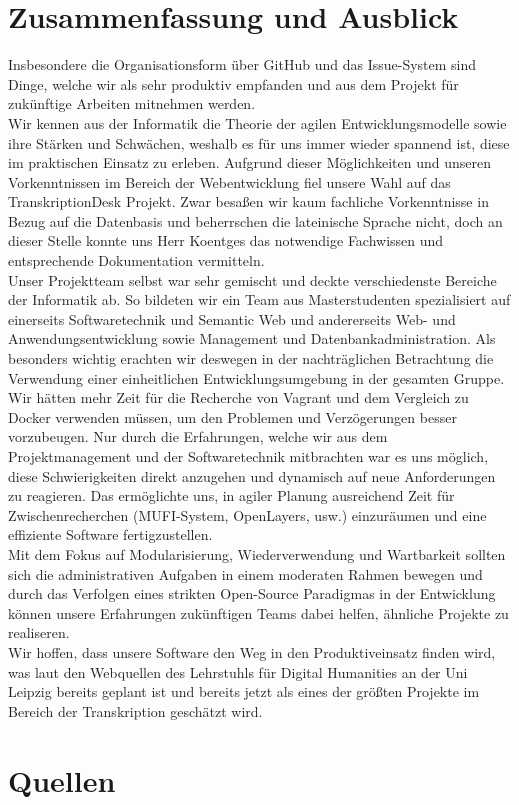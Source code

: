 \documentclass{article}
\begin{document}
\section{Zusammenfassung und Ausblick}
Insbesondere die Organisationsform über GitHub und das Issue-System sind Dinge, welche wir als sehr produktiv empfanden und aus dem Projekt für zukünftige Arbeiten mitnehmen werden.\\
Wir kennen aus der Informatik die Theorie der agilen Entwicklungsmodelle sowie ihre Stärken und Schwächen, weshalb es für uns immer wieder spannend ist, diese im praktischen Einsatz zu erleben.
Aufgrund dieser Möglichkeiten und unseren Vorkenntnissen im Bereich der Webentwicklung fiel unsere Wahl auf das TranskriptionDesk Projekt.
Zwar besaßen wir kaum fachliche Vorkenntnisse in Bezug auf die Datenbasis und beherrschen die lateinische Sprache nicht, doch an dieser Stelle konnte uns Herr Koentges das notwendige Fachwissen und entsprechende Dokumentation vermitteln.\\
Unser Projektteam selbst war sehr gemischt und deckte verschiedenste Bereiche der Informatik ab. So bildeten wir ein Team aus Masterstudenten 
spezialisiert auf einerseits Softwaretechnik und Semantic Web und andererseits Web- und Anwendungsentwicklung sowie Management und Datenbankadministration.
Als besonders wichtig erachten wir deswegen in der nachträglichen Betrachtung die Verwendung einer einheitlichen Entwicklungsumgebung in der gesamten Gruppe. \\
Wir hätten mehr Zeit für die Recherche von Vagrant und dem Vergleich zu Docker verwenden müssen, um den Problemen und Verzögerungen besser vorzubeugen.
Nur durch die Erfahrungen, welche wir aus dem Projektmanagement und der Softwaretechnik mitbrachten war es uns möglich, diese Schwierigkeiten direkt anzugehen und dynamisch auf neue Anforderungen zu reagieren.
Das ermöglichte uns, in agiler Planung ausreichend Zeit für Zwischenrecherchen (MUFI-System, OpenLayers, usw.) einzuräumen und eine effiziente Software fertigzustellen.\\
Mit dem Fokus auf Modularisierung, Wiederverwendung und Wartbarkeit sollten sich die administrativen Aufgaben in einem moderaten Rahmen bewegen und 
durch das Verfolgen eines strikten Open-Source Paradigmas in der Entwicklung können unsere Erfahrungen zukünftigen Teams dabei helfen, ähnliche Projekte zu realiseren.\\
Wir hoffen, dass unsere Software den Weg in den Produktiveinsatz finden wird, was laut den Webquellen des Lehrstuhls für Digital Humanities an der Uni Leipzig bereits geplant ist und bereits jetzt als eines der größten Projekte im Bereich der Transkription geschätzt wird.

\section*{Quellen}
  \printbibliography[%
    heading=none, %
  ]
\end{document}
